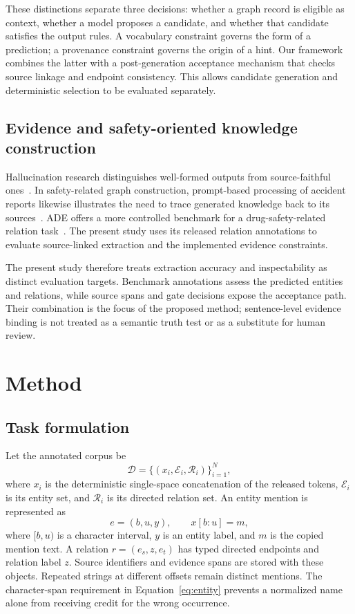 \documentclass[a4paper,fleqn,numbers,doubleblind]{cas-dc}
\begin{document}
These distinctions separate three decisions: whether a graph record is
eligible as context, whether a model proposes a candidate, and whether that
candidate satisfies the output rules. A vocabulary constraint governs the
form of a prediction; a provenance constraint governs the origin of a hint.
Our framework combines the latter with a post-generation acceptance mechanism
that checks source linkage and endpoint consistency. This allows candidate
generation and deterministic selection to be evaluated separately.

\subsection{Evidence and safety-oriented knowledge construction}
Hallucination research distinguishes well-formed outputs from source-faithful
ones~\cite{ji2023hallucination}. In safety-related graph construction,
prompt-based processing of accident reports likewise illustrates the need to
trace generated knowledge back to its sources~\cite{liu2025llmaccidentkg}.
ADE offers a more controlled benchmark for a drug-safety-related relation
task~\cite{gurulingappa2012ade}. The present study uses its released relation
annotations to evaluate source-linked extraction and the implemented evidence
constraints.

The present study therefore treats extraction accuracy and inspectability as
distinct evaluation targets. Benchmark annotations assess the predicted
entities and relations, while source spans and gate decisions expose the
acceptance path. Their combination is the focus of the proposed method;
sentence-level evidence binding is not treated as a semantic truth test or as
a substitute for human review.

\section{Method}
\label{sec:materials-methods}
\subsection{Task formulation}
\label{sec:method}
Let the annotated corpus be
\begin{equation}
\mathcal D=\{(x_i,\mathcal E_i,\mathcal R_i)\}_{i=1}^{N},
\label{eq:dataset}
\end{equation}
where $x_i$ is the deterministic single-space concatenation of the released
tokens, $\mathcal E_i$ is its entity set, and $\mathcal R_i$ is its directed
relation set. An entity mention is represented as
\begin{equation}
e=(b,u,y),\qquad x[b:u]=m,
\label{eq:entity}
\end{equation}
where $[b,u)$ is a character interval, $y$ is an entity label, and $m$ is the
copied mention text. A relation $r=(e_s,z,e_t)$ has typed directed endpoints
and relation label $z$. Source identifiers and evidence spans are stored with
these objects. Repeated strings at different offsets remain distinct mentions.
The character-span requirement in Equation~\eqref{eq:entity} prevents a
normalized name alone from receiving credit for the wrong occurrence.
\end{document}

